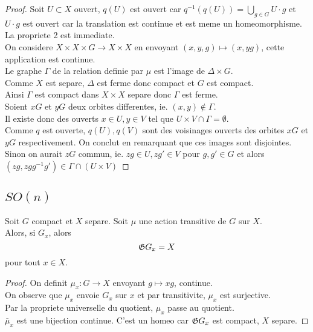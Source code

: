 \documentclass[../main.tex]{subfiles}
\begin{document}
\begin{proof}
Soit $U \subset X$ ouvert, $q( U) $ est ouvert car $q^{-1}( q( U) )= \bigcup_{g\in G} U\cdot g $ et $U\cdot g$ est ouvert car la translation est continue et est meme un homeomorphisme.\\
La propriete 2 est immediate.\\

On considere $X\times X\times G \to X\times X$ en envoyant $( x,y,g) \mapsto ( x,yg) $, cette application est continue.\\
Le graphe $\Gamma$ de la relation definie par $\mu$ est l'image de $\Delta \times G$.\\
Comme $X$ est separe, $\Delta$ est ferme donc compact et $G$ est compact.\\
Ainsi $\Gamma$ est compact dans $X\times X$ separe donc $\Gamma$ est ferme.\\
Soient $xG$ et $yG$ deux orbites differentes, ie. $( x,y) \notin \Gamma$.\\
Il existe donc des ouverts $x\in U, y\in V$ tel que $U\times V\cap \Gamma = \emptyset$.\\
Comme $q$ est ouverte, $q( U), q( V)  $ sont des voisinages ouverts des orbites $xG$ et $yG$ respectivement. On conclut en remarquant que ces images sont disjointes.\\
Sinon on aurait $zG$ commun, ie. $zg\in U, zg'\in V$ pour $g,g' \in G$ et alors $ ( zg, zgg^{-1}g') \in \Gamma \cap ( U\times V) $ 
\end{proof}
\subsection{ $SO( n) $ }
\begin{propo}
Soit $G$ compact et $X$ separe.
Soit $\mu$ une action transitive de $G$ sur $X$.\\
Alors, si $G_x  $, alors
\[ 
	\frak G G_x = X
\]
pour tout $x\in X$.
\end{propo}
\begin{proof}
On definit $\mu_x:G\to X$ envoyant $g\mapsto xg$, continue.\\
On observe que $\mu_x$ envoie $G_x$ sur $x$ et par transitivite, $\mu_x$ est surjective.\\
Par la propriete universelle du quotient, $\mu_x$ passe au quotient.\\
$\bar\mu_x$ est une bijection continue. C'est un homeo car $ \frak G G_x$ est compact, $X$ separe. 
\end{proof}



	
\end{document}
